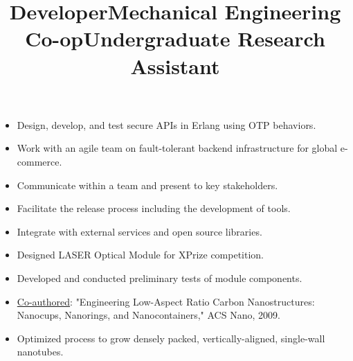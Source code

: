 \documentclass[line]{res}
\begin{document}
\begin{resume}
\title{Developer}
\begin{position}
\noindent
\vspace {-10 pt}
\begin{itemize}
\item Design, develop, and test secure APIs in Erlang using OTP behaviors.
\item Work with an agile team on fault-tolerant backend infrastructure for global e-commerce.
\item Communicate within a team and present to key stakeholders.
\item Facilitate the release process including the development of tools.
\item Integrate with external services and open source libraries.
\end{itemize}
\end{position}

\title{Mechanical Engineering Co-op}
\begin{position}
\noindent
\vspace {-10 pt}
\begin{itemize}
\item Designed LASER Optical Module for XPrize competition.
\item Developed and conducted preliminary tests of module components.
\end{itemize}
\end{position}

\title{Undergraduate Research Assistant}
\begin {position}
\vspace {-10 pt}
\begin{itemize}
\item \underline {Co-authored}: "Engineering Low-Aspect Ratio Carbon Nanostructures: Nanocups, Nanorings, and Nanocontainers," ACS Nano, 2009.
\item Optimized process to grow densely packed, vertically-aligned, single-wall nanotubes.
\end{itemize}
\end{position}


\end{resume}
\end{document}
